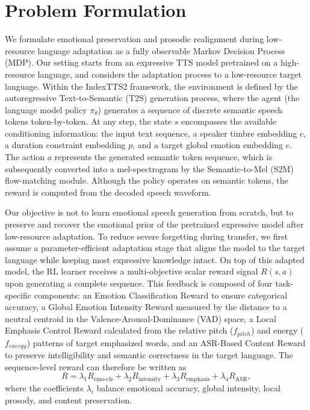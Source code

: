 \section{Problem Formulation}

We formulate emotional preservation and prosodic realignment during low-resource language adaptation as a fully observable Markov Decision Process (MDP). Our setting starts from an expressive TTS model pretrained on a high-resource language, and considers the adaptation process to a low-resource target language. Within the IndexTTS2 framework, the environment is defined by the autoregressive Text-to-Semantic (T2S) generation process, where the agent (the language model policy $\pi_\theta$) generates a sequence of discrete semantic speech tokens token-by-token. At any step, the state $s$ encompasses the available conditioning information: the input text sequence, a speaker timbre embedding $c$, a duration constraint embedding $p$, and a target global emotion embedding $e$. The action $a$ represents the generated semantic token sequence, which is subsequently converted into a mel-spectrogram by the Semantic-to-Mel (S2M) flow-matching module. Although the policy operates on semantic tokens, the reward is computed from the decoded speech waveform.

Our objective is not to learn emotional speech generation from scratch, but to preserve and recover the emotional prior of the pretrained expressive model after low-resource adaptation. To reduce severe forgetting during transfer, we first assume a parameter-efficient adaptation stage that aligns the model to the target language while keeping most expressive knowledge intact. On top of this adapted model, the RL learner receives a multi-objective scalar reward signal $R(s, a)$ upon generating a complete sequence. This feedback is composed of four task-specific components: an Emotion Classification Reward to ensure categorical accuracy, a Global Emotion Intensity Reward measured by the distance to a neutral centroid in the Valence-Arousal-Dominance (VAD) space, a Local Emphasis Control Reward calculated from the relative pitch ($f_{pitch}$) and energy ($f_{energy}$) patterns of target emphasized words, and an ASR-Based Content Reward to preserve intelligibility and semantic correctness in the target language. The sequence-level reward can therefore be written as
\[
R = \lambda_1 R_{\text{emo-cls}} + \lambda_2 R_{\text{intensity}} + \lambda_3 R_{\text{emphasis}} + \lambda_4 R_{\text{ASR}},
\]
where the coefficients $\lambda_i$ balance emotional accuracy, global intensity, local prosody, and content preservation.

